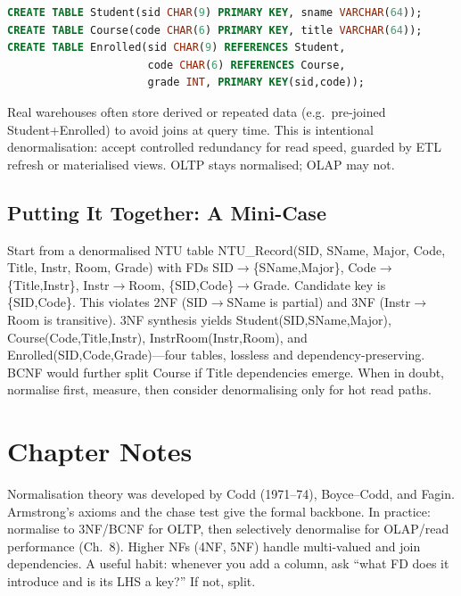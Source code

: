 \begin{lstlisting}[language=SQL, caption={3NF tables for enrolment}, label={lst:3nf}]
CREATE TABLE Student(sid CHAR(9) PRIMARY KEY, sname VARCHAR(64));
CREATE TABLE Course(code CHAR(6) PRIMARY KEY, title VARCHAR(64));
CREATE TABLE Enrolled(sid CHAR(9) REFERENCES Student,
                      code CHAR(6) REFERENCES Course,
                      grade INT, PRIMARY KEY(sid,code));
\end{lstlisting}

\begin{remark}[Denormalisation]
\begin{sloppypar}
Real warehouses often store derived or repeated data (e.g.\ pre-joined Student+Enrolled) to avoid joins at query time. This is intentional denormalisation: accept controlled redundancy for read speed, guarded by ETL refresh or materialised views. OLTP stays normalised; OLAP may not.
\end{sloppypar}
\end{remark}

\subsection{Putting It Together: A Mini-Case}

\begin{sloppypar}
Start from a denormalised NTU table NTU\_Record(SID, SName, Major, Code, Title, Instr, Room, Grade) with FDs SID$\to$\{SName,Major\}, Code$\to$\{Title,Instr\}, Instr$\to$Room, \{SID,Code\}$\to$Grade. Candidate key is \{SID,Code\}. This violates 2NF (SID$\to$SName is partial) and 3NF (Instr$\to$Room is transitive). 3NF synthesis yields Student(SID,SName,Major), Course(Code,Title,Instr), InstrRoom(Instr,Room), and Enrolled(SID,Code,Grade)---four tables, lossless and dependency-preserving. BCNF would further split Course if Title dependencies emerge. When in doubt, normalise first, measure, then consider denormalising only for hot read paths.
\end{sloppypar}

\section{Chapter Notes}

Normalisation theory was developed by Codd (1971--74), Boyce--Codd, and Fagin. Armstrong's axioms and the chase test give the formal backbone. In practice: normalise to 3NF/BCNF for OLTP, then selectively denormalise for OLAP/read performance (Ch.~8). Higher NFs (4NF, 5NF) handle multi-valued and join dependencies. A useful habit: whenever you add a column, ask ``what FD does it introduce and is its LHS a key?'' If not, split.

